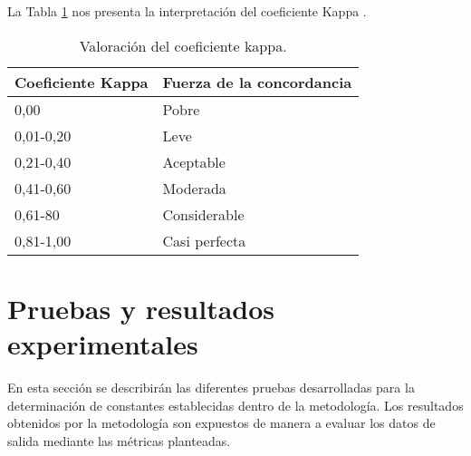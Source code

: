 La Tabla \ref{t:kappaTable} nos presenta la interpretaci\'on del coeficiente Kappa \cite{landis1977measurement}.
		\begin{table}[H]
			\centering
			\begin{tabular}{|l|l|}
				\hline
				\rowcolor[HTML]{EFEFEF} 
				\textbf{Coeficiente Kappa} & \textbf{Fuerza de la concordancia} \\ \hline
				0,00                       & Pobre                              \\ \hline
				0,01-0,20                  & Leve                               \\ \hline
				0,21-0,40                  & Aceptable                          \\ \hline
				0,41-0,60                  & Moderada                           \\ \hline
				0,61-80                    & Considerable                       \\ \hline
				0,81-1,00                  & Casi perfecta                      \\ \hline
			\end{tabular}
						\caption{Valoraci\'on del coeficiente kappa.}
						\label{t:kappaTable}
		\end{table}
		


\section{Pruebas y resultados experimentales}
En esta secci\'on se describir\'an las diferentes pruebas desarrolladas para la determinaci\'on de constantes establecidas dentro de la metodolog\'ia. Los resultados obtenidos por la metodolog\'ia son expuestos de manera a evaluar los datos de salida mediante las m\'etricas planteadas.
